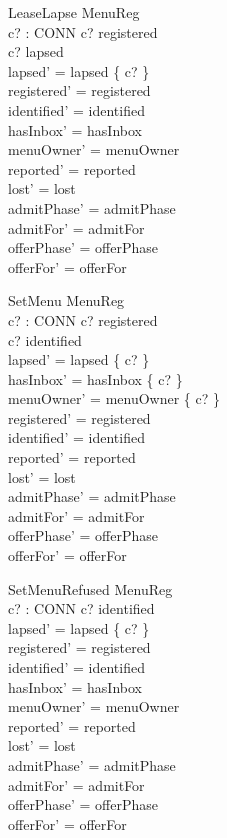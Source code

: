 \documentclass[a4paper,10pt,fleqn]{article}
\begin{document}
\begin{schema}{LeaseLapse}
  \Delta MenuReg \\
  c? : CONN
\where
  c? \in registered \\
  c? \notin lapsed \\
  lapsed' = lapsed \cup \{ c? \} \\
  registered' = registered \\
  identified' = identified \\
  hasInbox' = hasInbox \\
  menuOwner' = menuOwner \\
  reported' = reported \\
  lost' = lost \\
  admitPhase' = admitPhase \\
  admitFor' = admitFor \\
  offerPhase' = offerPhase \\
  offerFor' = offerFor
\end{schema}

\begin{schema}{SetMenu}
  \Delta MenuReg \\
  c? : CONN
\where
  c? \in registered \\
  c? \in identified \\
  lapsed' = lapsed \setminus \{ c? \} \\
  hasInbox' = hasInbox \cup \{ c? \} \\
  menuOwner' = menuOwner \cup \{ c? \} \\
  registered' = registered \\
  identified' = identified \\
  reported' = reported \\
  lost' = lost \\
  admitPhase' = admitPhase \\
  admitFor' = admitFor \\
  offerPhase' = offerPhase \\
  offerFor' = offerFor
\end{schema}

\begin{schema}{SetMenuRefused}
  \Delta MenuReg \\
  c? : CONN
\where
  c? \notin identified \\
  lapsed' = lapsed \setminus \{ c? \} \\
  registered' = registered \\
  identified' = identified \\
  hasInbox' = hasInbox \\
  menuOwner' = menuOwner \\
  reported' = reported \\
  lost' = lost \\
  admitPhase' = admitPhase \\
  admitFor' = admitFor \\
  offerPhase' = offerPhase \\
  offerFor' = offerFor
\end{schema}
\end{document}
